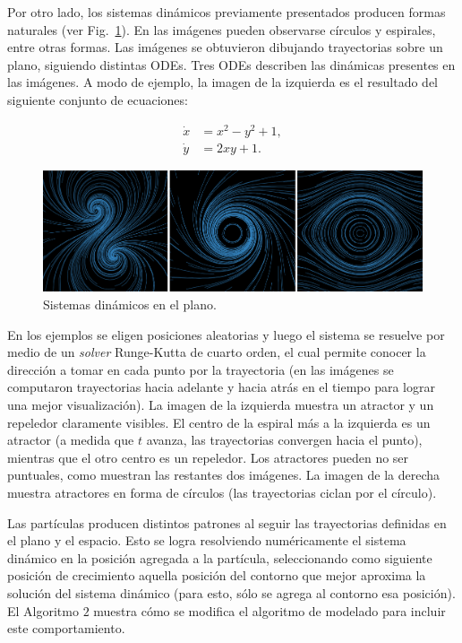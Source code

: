 Por otro lado, los sistemas din\'amicos previamente presentados producen formas naturales (ver Fig.~\ref{fg:sistdin2}).
En las im\'agenes pueden observarse c\'irculos y espirales, entre otras formas.
Las im\'agenes se obtuvieron dibujando trayectorias sobre un plano, siguiendo distintas ODEs.
Tres ODEs describen las din\'amicas presentes en las im\'agenes. A modo de ejemplo, la imagen de la izquierda es el resultado del siguiente conjunto de ecuaciones:

\begin{equation} \label{eq:simple}  
  \begin{aligned}
    \dot{x} &= x^{2}-y^{2}+1,\\
    \dot{y} &= 2xy+1.
  \end{aligned}
\end{equation}


\begin{figure}[htb!]
  \centerline{\includegraphics[width=13cm]{sistdin2}}
  \caption{Sistemas dinámicos en el plano.}
  \label{fg:sistdin2}
\end{figure}

En los ejemplos se eligen posiciones aleatorias y luego el sistema se resuelve por medio de un {\em solver} Runge-Kutta de cuarto orden, el cual permite conocer la direcci\'on a tomar en cada punto por la trayectoria (en las im\'agenes se computaron trayectorias hacia adelante y hacia atrás en el tiempo para lograr una mejor visualizaci\'on).
La imagen de la izquierda muestra un atractor y un repeledor claramente visibles.
El centro de la espiral m\'as a la izquierda es un atractor (a medida que $t$ avanza, las trayectorias convergen hacia el punto), mientras que el otro centro es un repeledor.
Los atractores pueden no ser puntuales, como muestran las restantes dos im\'agenes.
La imagen de la derecha muestra atractores en forma de c\'irculos (las trayectorias ciclan por el c\'irculo).

Las part\'iculas producen distintos patrones al seguir las trayectorias definidas en el plano y el espacio.
Esto se logra resolviendo num\'ericamente el sistema din\'amico en la posici\'on agregada a la part\'icula, seleccionando como siguiente posici\'on de crecimiento aquella posici\'on del contorno que mejor aproxima la soluci\'on del sistema din\'amico (para esto, sólo se agrega al contorno esa posición).
El Algoritmo $2$ muestra cómo se modifica el algoritmo de modelado para incluir este comportamiento.

